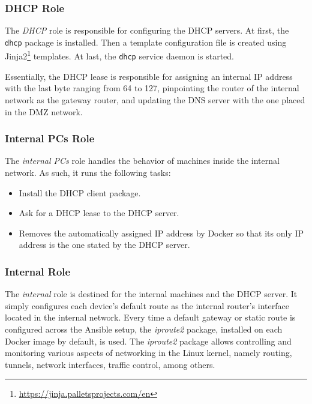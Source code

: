 \subsubsection{DHCP Role} \label{sec:ansible_dhcp_role}

The \textit{DHCP} role is responsible for configuring the DHCP servers. At first, the \texttt{dhcp} package is installed. Then a template configuration file is created using Jinja2\footnote{\url{https://jinja.palletsprojects.com/en}} templates. At last, the \texttt{dhcp} service daemon is started.

Essentially, the DHCP lease is responsible for assigning an internal IP address with the last byte ranging from 64 to 127, pinpointing the router of the internal network as the gateway router, and updating the DNS server with the one placed in the DMZ network.

\subsubsection{Internal PCs Role} \label{sec:ansible_internal_pcs_role}

The \textit{internal PCs} role handles the behavior of machines inside the internal network. As such, it runs the following tasks:

\begin{itemize}
    \item Install the DHCP client package.
    \item Ask for a DHCP lease to the DHCP server.
    \item Removes the automatically assigned IP address by Docker so that its only IP address is the one stated by the DHCP server.
\end{itemize}

\subsubsection{Internal Role} \label{sec:ansible_internal_role}

The \textit{internal} role is destined for the internal machines and the DHCP server. It simply configures each device's default route as the internal router's interface located in the internal network. Every time a default gateway or static route is configured across the Ansible setup, the \textit{iproute2} package, installed on each Docker image by default, is used. The \textit{iproute2} package allows controlling and monitoring various aspects of networking in the Linux kernel, namely routing, tunnels, network interfaces, traffic control, among others.

